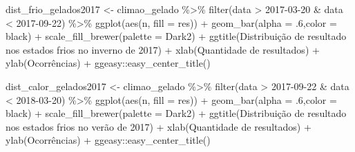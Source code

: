 \documentclass[
]{article}
\newenvironment{Shaded}{\begin{snugshade}}{\end{snugshade}}
\newcommand{\AttributeTok}[1]{\textcolor[rgb]{0.77,0.63,0.00}{#1}}
\newcommand{\DecValTok}[1]{\textcolor[rgb]{0.00,0.00,0.81}{#1}}
\newcommand{\FunctionTok}[1]{\textcolor[rgb]{0.00,0.00,0.00}{#1}}
\newcommand{\NormalTok}[1]{#1}
\newcommand{\OtherTok}[1]{\textcolor[rgb]{0.56,0.35,0.01}{#1}}
\newcommand{\SpecialCharTok}[1]{\textcolor[rgb]{0.00,0.00,0.00}{#1}}
\newcommand{\StringTok}[1]{\textcolor[rgb]{0.31,0.60,0.02}{#1}}
\begin{document}
\begin{Shaded}
\begin{Highlighting}[]
\NormalTok{dist\_frio\_gelados2017 }\OtherTok{\textless{}{-}}\NormalTok{ climao\_gelado }\SpecialCharTok{\%\textgreater{}\%} 
  \FunctionTok{filter}\NormalTok{(data }\SpecialCharTok{\textgreater{}} \StringTok{\textquotesingle{}2017{-}03{-}20\textquotesingle{}} \SpecialCharTok{\&}\NormalTok{ data }\SpecialCharTok{\textless{}} \StringTok{\textquotesingle{}2017{-}09{-}22\textquotesingle{}}\NormalTok{) }\SpecialCharTok{\%\textgreater{}\%}
  \FunctionTok{ggplot}\NormalTok{(}\FunctionTok{aes}\NormalTok{(n, }\AttributeTok{fill =}\NormalTok{ res)) }\SpecialCharTok{+} 
  \FunctionTok{geom\_bar}\NormalTok{(}\AttributeTok{alpha =}\NormalTok{ .}\DecValTok{6}\NormalTok{,}\AttributeTok{color =} \StringTok{\textquotesingle{}black\textquotesingle{}}\NormalTok{) }\SpecialCharTok{+} 
  \FunctionTok{scale\_fill\_brewer}\NormalTok{(}\AttributeTok{palette =} \StringTok{\textquotesingle{}Dark2\textquotesingle{}}\NormalTok{) }\SpecialCharTok{+}
  \FunctionTok{ggtitle}\NormalTok{(}\StringTok{\textquotesingle{}Distribuição de resultado nos estados frios no inverno de 2017\textquotesingle{}}\NormalTok{) }\SpecialCharTok{+}
  \FunctionTok{xlab}\NormalTok{(}\StringTok{\textquotesingle{}Quantidade de resultados\textquotesingle{}}\NormalTok{) }\SpecialCharTok{+} \FunctionTok{ylab}\NormalTok{(}\StringTok{\textquotesingle{}Ocorrências\textquotesingle{}}\NormalTok{) }\SpecialCharTok{+}
\NormalTok{  ggeasy}\SpecialCharTok{::}\FunctionTok{easy\_center\_title}\NormalTok{()}

\NormalTok{dist\_calor\_gelados2017 }\OtherTok{\textless{}{-}}\NormalTok{ climao\_gelado }\SpecialCharTok{\%\textgreater{}\%} 
  \FunctionTok{filter}\NormalTok{(data }\SpecialCharTok{\textgreater{}} \StringTok{\textquotesingle{}2017{-}09{-}22\textquotesingle{}} \SpecialCharTok{\&}\NormalTok{ data }\SpecialCharTok{\textless{}} \StringTok{\textquotesingle{}2018{-}03{-}20\textquotesingle{}}\NormalTok{) }\SpecialCharTok{\%\textgreater{}\%}
  \FunctionTok{ggplot}\NormalTok{(}\FunctionTok{aes}\NormalTok{(n, }\AttributeTok{fill =}\NormalTok{ res)) }\SpecialCharTok{+} 
  \FunctionTok{geom\_bar}\NormalTok{(}\AttributeTok{alpha =}\NormalTok{ .}\DecValTok{6}\NormalTok{,}\AttributeTok{color =} \StringTok{\textquotesingle{}black\textquotesingle{}}\NormalTok{) }\SpecialCharTok{+} 
  \FunctionTok{scale\_fill\_brewer}\NormalTok{(}\AttributeTok{palette =} \StringTok{\textquotesingle{}Dark2\textquotesingle{}}\NormalTok{) }\SpecialCharTok{+}
  \FunctionTok{ggtitle}\NormalTok{(}\StringTok{\textquotesingle{}Distribuição de resultado nos estados frios no verão de 2017\textquotesingle{}}\NormalTok{) }\SpecialCharTok{+}
  \FunctionTok{xlab}\NormalTok{(}\StringTok{\textquotesingle{}Quantidade de resultados\textquotesingle{}}\NormalTok{) }\SpecialCharTok{+} \FunctionTok{ylab}\NormalTok{(}\StringTok{\textquotesingle{}Ocorrências\textquotesingle{}}\NormalTok{) }\SpecialCharTok{+}
\NormalTok{  ggeasy}\SpecialCharTok{::}\FunctionTok{easy\_center\_title}\NormalTok{()}



\end{Highlighting}
\end{Shaded}
\end{document}
